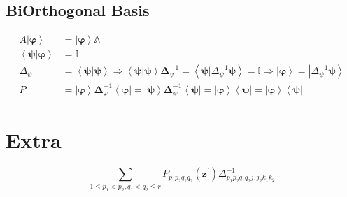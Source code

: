 \documentclass[aps,preprint]{revtex4}%
\begin{document}
\subsection{BiOrthogonal Basis}%

\begin{align}
A\left\vert \mathbf{\varphi}\right\rangle  &  =\left\vert \mathbf{\varphi
}\right\rangle \mathbb{A}\nonumber\\
\left\langle \left.  \mathbf{\psi}\right\vert \mathbf{\varphi}\right\rangle
&  =\mathbb{I}\nonumber\\
\Delta_{\psi}  &  =\left\langle \left.  \mathbf{\psi}\right\vert \mathbf{\psi
}\right\rangle \Rightarrow\left\langle \left.  \mathbf{\psi}\right\vert
\mathbf{\psi}\right\rangle \mathbf{\Delta}_{\psi}^{-1}=\left\langle \left.
\mathbf{\psi}\right\vert \Delta_{\psi}^{-1}\mathbf{\psi}\right\rangle
=\mathbb{I}\Rightarrow\left\vert \mathbf{\varphi}\right\rangle =\left\vert
\Delta_{\psi}^{-1}\mathbf{\psi}\right\rangle \nonumber\\
P  &  =\left\vert \mathbf{\varphi}\right\rangle \mathbf{\Delta}_{\varphi}%
^{-1}\left\langle \mathbf{\varphi}\right\vert =\left\vert \mathbf{\psi
}\right\rangle \mathbf{\Delta}_{\psi}^{-1}\left\langle \mathbf{\psi
}\right\vert =\left\vert \mathbf{\varphi}\right\rangle \left\langle
\mathbf{\psi}\right\vert =\left\vert \mathbf{\varphi}\right\rangle
\left\langle \mathbf{\psi}\right\vert
\end{align}


\section{Extra}%

\begin{equation}
\sum_{1\leq p_{1}<p_{2},q_{1}<q_{2}\leq r}P_{p_{1}p_{2}q_{1}q_{2}}\left(
\mathbf{z}^{\prime}\right)  \Delta_{p_{1}p_{2}q_{1}q_{2}j_{1}j_{2}k_{1}k_{2}%
}^{-1}%
\end{equation}
%
\end{document}
